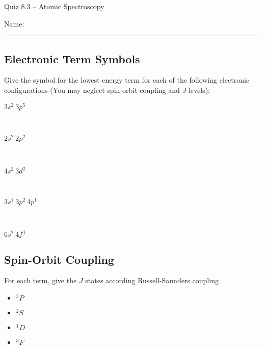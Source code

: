 \documentclass[11pt, letterpaper]{memoir}
\begin{document}
	\begin{center}
		{\large Quiz 8.3 -- Atomic Spectroscopy}
	\end{center}
	{\large Name: \rule[-1mm]{4in}{.1pt} 


\subsection*{Electronic Term Symbols}
Give the symbol for the lowest energy term for each of the following electronic configurations (You may neglect spin-orbit coupling and $J$-levels):

\begin{description}
	\item[$3s^2~3p^5$]~
	
	\vspace{3em}
	\item[$2s^2~2p^2$] ~
	
	\vspace{3em}
	\item[$4s^2~3d^2$] ~
	
	\vspace{3em}
	\item[$3s^1~3p^2~4p^1$] ~
	
	\vspace{3em}
	\item[$6s^2~4f^4$]
\end{description}

\vspace{2em}
\subsection*{Spin-Orbit Coupling}

For each term, give the $J$ states according Russell-Saunders coupling

\begin{itemize}
	\item $^3P$
	
	\vspace{3em}
	\item $^2S$
	
	\vspace{3em}
	\item $^1D$
	
	\vspace{3em}
	\item $^3F$
\end{itemize}

\vspace{2em}
}
\end{document}
